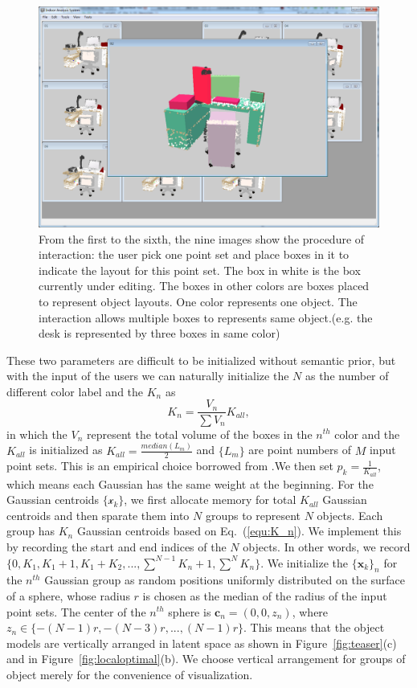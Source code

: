 \begin{figure}[htb]
	\includegraphics[width=.3\linewidth]{images/interact06.png}
	\caption{\label{fig:interact}
		From the first to the sixth, the nine images show the procedure of interaction:
		the user pick one point set and place boxes in it to indicate the layout for this point set. The box in white is the box currently under editing. The boxes in other colors are boxes placed to represent object layouts. One color represents one object. The interaction allows multiple boxes to represents same object.(e.g. the desk is represented by three boxes in same color)}
\end{figure}
These two parameters are difficult to be initialized without semantic prior, but with the input of the users we can naturally initialize the $N$ as the number of different color label and the ${K_n}$ as 
\begin{equation}
\label{equ:K_n}
K_n=\frac{V_n}{\sum V_n}K_{all},
\end{equation}
in which the $V_n$ represent the total volume of the boxes in the $n^{th}$ color and the $K_{all}$ is initialized as $K_{all}=\frac{median(L_m)}{2}$ and $\{L_m\}$ are point numbers of $M$ input point sets. This is an empirical choice borrowed from \cite{Evangelidis2014}.We then set $p_k=\frac{1}{K_{all}}$, which means each Gaussian has the same weight at the beginning. For the Gaussian centroids $\{\mathcal{x}_k\}$, we first allocate memory for total $K_{all}$ Gaussian centroids and then sparate them into $N$ groups to represent $N$ objects. Each group has $K_n$ Gaussian centroids based on Eq.~(\ref{equ:K_n}). We implement this by recording the start and end indices of the $N$ objects. In other words, we record $\{0,K_1,K_1+1,K_1+K_2,...,\sum^{N-1}K_n+1,\sum^N K_n\}$. We initialize the $\{\mathbf{x}_k\}_n$ for the $n^{th}$ Gaussian group as random positions uniformly distributed on the surface of a sphere, whose radius $r$ is chosen as the median of the radius of the input point sets. 
%
The center of the $n^{th}$ sphere is $\mathbf{c}_n=(0,0,z_n)$, where $z_n\in \{-(N-1)r,-(N-3)r,...,(N-1)r\}$.
%
This means that the object models are vertically arranged in latent space as shown in Figure~\ref{fig:teaser}(c) and in Figure~\ref{fig:localoptimal}(b). 
We choose vertical arrangement for groups of object merely for the convenience of visualization.
